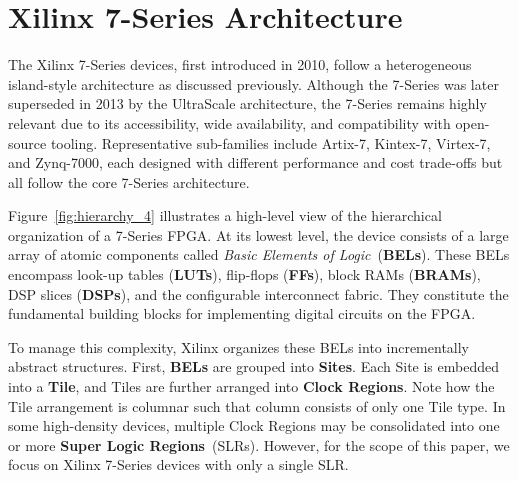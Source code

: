 \section{Xilinx 7-Series Architecture}
\label{sec:7_series}
The Xilinx 7-Series devices, first introduced in 2010, follow a heterogeneous island-style architecture as discussed previously. 
Although the 7-Series was later superseded in 2013 by the UltraScale architecture, the 7-Series remains highly relevant due to its accessibility, wide availability, and compatibility with open-source tooling. 
Representative sub-families include Artix-7, Kintex-7, Virtex-7, and Zynq-7000, each designed with different performance and cost trade-offs but all follow the core 7-Series architecture.


Figure~\ref{fig:hierarchy_4} illustrates a high-level view of the hierarchical organization of a 7-Series FPGA. 
At its lowest level, the device consists of a large array of atomic components called \emph{Basic Elements of Logic}~(\textbf{BELs}). 
These BELs encompass look-up tables (\textbf{LUTs}), flip-flops (\textbf{FFs}), block RAMs (\textbf{BRAMs}), DSP slices (\textbf{DSPs}), and the configurable interconnect fabric. 
They constitute the fundamental building blocks for implementing digital circuits on the FPGA.

To manage this complexity, Xilinx organizes these BELs into incrementally abstract structures. 
First, \textbf{BELs} are grouped into \textbf{Sites}. 
Each Site is embedded into a \textbf{Tile}, and Tiles are further arranged into \textbf{Clock Regions}. 
Note how the Tile arrangement is columnar such that column consists of only one Tile type. 
In some high-density devices, multiple Clock Regions may be consolidated into one or more \textbf{Super Logic Regions}~(SLRs). 
However, for the scope of this paper, we focus on Xilinx 7-Series devices with only a single SLR.

